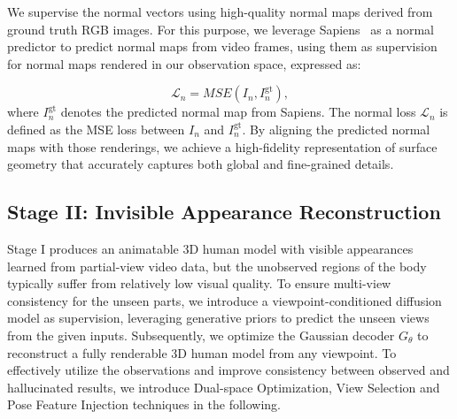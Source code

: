 We supervise the normal vectors using high-quality normal maps derived from ground truth RGB images. For this purpose, we leverage Sapiens~\cite{khirodkar2024sapiens} as a normal predictor to predict normal maps from video frames, using them as supervision for normal maps rendered in our observation space, expressed as:

\begin{equation}
\mathcal{L}_n = MSE(I_n,I^{\text{gt}}_{n}),
  \label{eq:normalloss}
\end{equation}
where $I^{\text{gt}}_{n}$ denotes the predicted normal map from Sapiens. The normal loss $\mathcal{L}_n$ is defined as the MSE loss between $I_{n}$ and $I^{\text{gt}}_{n}$. By aligning the predicted normal maps with those renderings, we achieve a high-fidelity representation of surface geometry that accurately captures both global and fine-grained details.


\subsection{Stage II: Invisible Appearance Reconstruction}
\label{fine-tuning}
Stage I produces an animatable 3D human model with visible appearances learned from partial-view video data, but the unobserved regions of the body typically suffer from relatively low visual quality. To ensure multi-view consistency for the unseen parts, we introduce a viewpoint-conditioned diffusion model as supervision, leveraging generative priors to predict the unseen views from the given inputs. Subsequently, we optimize the Gaussian decoder $G_{\theta}$ to reconstruct a fully renderable 3D human model from any viewpoint. To effectively utilize the observations and improve consistency between observed and hallucinated results, we introduce Dual-space Optimization, View Selection and Pose Feature Injection techniques in the following.


